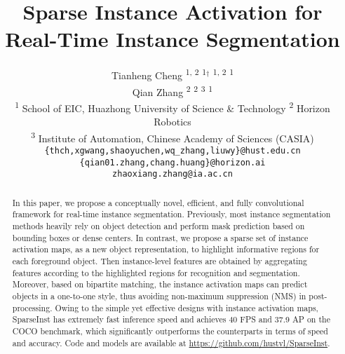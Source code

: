 \documentclass[10pt,twocolumn,letterpaper]{article}
\begin{document}
\title{Sparse Instance Activation for Real-Time Instance Segmentation}





\author{
{Tianheng Cheng} \textsuperscript{1, 2}  \textsuperscript{1}$^\dag$  \textsuperscript{1, 2}  \textsuperscript{1} \\
{Qian Zhang} \textsuperscript{2}  \textsuperscript{2}  \textsuperscript{3}  \textsuperscript{1}
\\
\textsuperscript{1} School of EIC, Huazhong University of Science \& Technology \quad \textsuperscript{2} Horizon Robotics \\
\textsuperscript{3} Institute of Automation, Chinese Academy of Sciences (CASIA) \\
{\tt\small \{thch,xgwang,shaoyuchen,wq\_zhang,liuwy\}@hust.edu.cn \quad \{qian01.zhang,chang.huang\}@horizon.ai} \\ 
{\tt\small zhaoxiang.zhang@ia.ac.cn}}

\maketitle

\begin{abstract}
In this paper, we propose a conceptually novel, efficient, and fully convolutional framework for real-time instance segmentation. Previously, most instance segmentation methods heavily rely on object detection and perform mask prediction based on bounding boxes or dense centers. In contrast, we propose a sparse set of instance activation maps, as a new object representation, to highlight informative regions for each foreground object. Then instance-level features are obtained by aggregating features according to the highlighted regions for recognition and segmentation. Moreover, based on bipartite matching, the instance activation maps can predict objects in a one-to-one style, thus avoiding non-maximum suppression (NMS) in post-processing. Owing to the simple yet effective designs with instance activation maps, SparseInst has extremely fast inference speed and achieves 40 FPS and 37.9 AP on the COCO benchmark, which significantly outperforms the counterparts in terms of speed and accuracy. Code and models
are available at \url{https://github.com/hustvl/SparseInst}.

\end{abstract}
\end{document}
